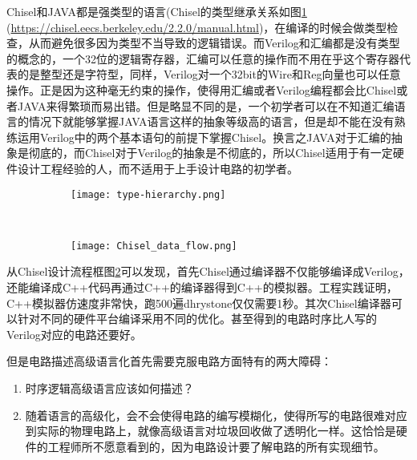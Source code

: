 Chisel和JAVA都是强类型的语言(Chisel的类型继承关系如图\ref{fig:type} (\url{https://chisel.eecs.berkeley.edu/2.2.0/manual.html})，在编译的时候会做类型检查，从而避免很多因为类型不当导致的逻辑错误。而Verilog和汇编都是没有类型的概念的，一个32位的逻辑寄存器，汇编可以任意的操作而不用在乎这个寄存器代表的是整型还是字符型，同样，Verilog对一个32bit的Wire和Reg向量也可以任意操作。正是因为这种毫无约束的操作，使得用汇编或者Verilog编程都会比Chisel或者JAVA来得繁琐而易出错。但是略显不同的是，一个初学者可以在不知道汇编语言的情况下就能够掌握JAVA语言这样的抽象等级高的语言，但是却不能在没有熟练运用Verilog中的两个基本语句的前提下掌握Chisel。换言之JAVA对于汇编的抽象是彻底的，而Chisel对于Verilog的抽象是不彻底的，所以Chisel适用于有一定硬件设计工程经验的人，而不适用于上手设计电路的初学者。
\begin{figure}[!htbp]
	\centering
	\begin{subfigure}[b]{0.35\textwidth}
		\texttt{[image: type-hierarchy.png]}
		\caption{}
		\label{fig:type}
	\end{subfigure}%
	~%
	\begin{subfigure}[b]{0.65\textwidth}
		\texttt{[image: Chisel\_data\_flow.png]}
		\caption{}
		\label{fig:design_flow}
	\end{subfigure}
	\label{fig:chisel_into}
\end{figure}

从Chisel设计流程框图\ref{fig:design_flow}可以发现，首先Chisel通过编译器不仅能够编译成Verilog，还能编译成C++代码再通过C++的编译器得到C++的模拟器。工程实践证明，C++模拟器仿速度非常快，跑500遍dhrystone仅仅需要1秒。其次Chisel编译器可以针对不同的硬件平台编译采用不同的优化。甚至得到的电路时序比人写的Verilog对应的电路还要好。

但是电路描述高级语言化首先需要克服电路方面特有的两大障碍：
\begin{enumerate}
	\item 时序逻辑高级语言应该如何描述？
	\item 随着语言的高级化，会不会使得电路的编写模糊化，使得所写的电路很难对应到实际的物理电路上，就像高级语言对垃圾回收做了透明化一样。这恰恰是硬件的工程师所不愿意看到的，因为电路设计要了解电路的所有实现细节。
\end{enumerate}

